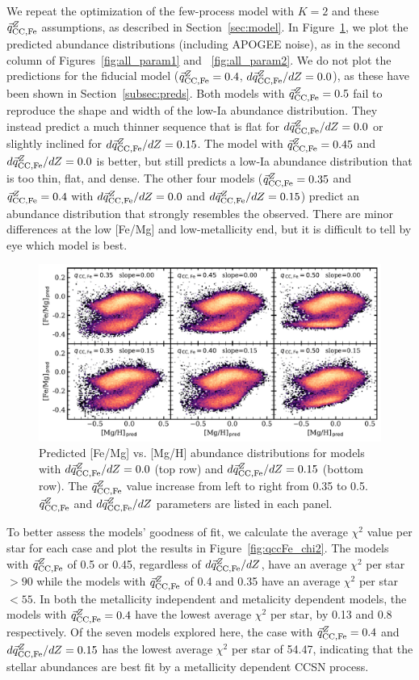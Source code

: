 \documentclass[modern]{aastex631}
\newcommand{\qccFe}{\vec{q}_{{\rm CC, Fe}}^{Z}}
\newcommand{\dqccFe}{d\vec{q}_{{\rm CC, Fe}}^{Z}/dZ}
\begin{document}
We repeat the optimization of the few-process model with $K=2$ and these $\qccFe$ assumptions, as described in Section~\ref{sec:model}. In Figure~\ref{fig:qccFe_FeMgpred}, we plot the predicted abundance distributions (including APOGEE noise), as in the second column of Figures~\ref{fig:all_param1} and ~\ref{fig:all_param2}. We do not plot the predictions for the fiducial model ($\qccFe=0.4$, $\dqccFe=0.0$), as these have been shown in Section~\ref{subsec:preds}. Both models with $\qccFe=0.5$ fail to reproduce the shape and width of the low-Ia abundance distribution. They instead predict a much thinner sequence that is flat for $\dqccFe=0.0$ or slightly inclined for $\dqccFe=0.15$. The model with $\qccFe=0.45$ and $\dqccFe=0.0$ is better, but still predicts a low-Ia abundance distribution that is too thin, flat, and dense. The other four models ($\qccFe=0.35$ and $\qccFe=0.4$ with $\dqccFe=0.0$ and $\dqccFe=0.15$) predict an abundance distribution that strongly resembles the observed. There are minor differences at the low [Fe/Mg] and low-metallicity end, but it is difficult to tell by eye which model is best.

\begin{figure}[htb!]
    \centering
    \includegraphics[width=\textwidth]{Paper/Figures/qccFe_FeMgpred.pdf}
    \caption{Predicted [Fe/Mg] vs. [Mg/H] abundance distributions for models with $\dqccFe=0.0$ (top row) and $\dqccFe=0.15$ (bottom row). The $\qccFe$ value increase from left to right from 0.35 to 0.5. $\qccFe$ and $\dqccFe$ parameters are listed in each panel.}
    \label{fig:qccFe_FeMgpred}
\end{figure}

To better assess the models' goodness of fit, we calculate the average $\chi^2$ value per star for each case and plot the results in Figure~\ref{fig:qccFe_chi2}. The models with $\qccFe$ of 0.5 or 0.45, regardless of $\dqccFe$, have an average $\chi^2$ per star $>90$ while the models with $\qccFe$ of 0.4 and 0.35 have an average $\chi^2$ per star $< 55$. In both the metallicity independent and metalicity dependent models, the models with $\qccFe=0.4$ have the lowest average $\chi^2$ per star, by 0.13 and 0.8 respectively. Of the seven models explored here, the case with $\qccFe=0.4$ and $\dqccFe=0.15$ has the lowest average $\chi^2$ per star of 54.47, indicating that the stellar abundances are best fit by a metallicity dependent CCSN process. 
\end{document}
